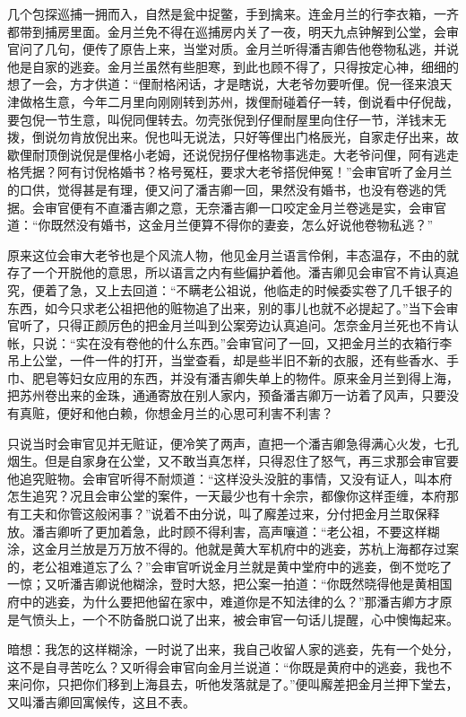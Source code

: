 \documentclass[12pt,UTF8]{ctexbook}
\begin{document}
{{{几个包探巡捕一拥而入，自然是瓮中捉鳖，手到擒来。连金月兰的行李衣箱，一齐都带到捕房里面。金月兰免不得在巡捕房内关了一夜，明天九点钟解到公堂，会审官问了几句，便传了原告上来，当堂对质。金月兰听得潘吉卿告他卷物私逃，并说他是自家的逃妾。金月兰虽然有些胆寒，到此也顾不得了，只得按定心神，细细的想了一会，方才供道：“俚耐格闲话，才是瞎说，大老爷勿要听俚。倪一径来浪天津做格生意，今年二月里向刚刚转到苏州，拨俚耐碰着仔一转，倒说看中仔倪哉，要包倪一节生意，叫倪同俚转去。勿壳张倪到仔俚耐屋里向住仔一节，洋钱末无拨，倒说勿肯放倪出来。倪也叫无说法，只好等俚出门格辰光，自家走仔出来，故歇俚耐顶倒说倪是俚格小老姆，还说倪拐仔俚格物事逃走。大老爷问俚，阿有逃走格凭据？阿有讨倪格婚书？格号冤枉，要求大老爷搭倪伸冤！”会审官听了金月兰的口供，觉得甚是有理，便又问了潘吉卿一回，果然没有婚书，也没有卷逃的凭据。会审官便有不直潘吉卿之意，无奈潘吉卿一口咬定金月兰卷逃是实，会审官道：“你既然没有婚书，这金月兰便算不得你的妻妾，怎么好说他卷物私逃？”

原来这位会审大老爷也是个风流人物，他见金月兰语言伶俐，丰态温存，不由的就存了一个开脱他的意思，所以语言之内有些偏护着他。潘吉卿见会审官不肯认真追究，便着了急，又上去回道：“不瞒老公祖说，他临走的时候委实卷了几千银子的东西，如今只求老公祖把他的赃物追了出来，别的事儿也就不必提起了。”当下会审官听了，只得正颜厉色的把金月兰叫到公案旁边认真追问。怎奈金月兰死也不肯认帐，只说：“实在没有卷他的什么东西。”会审官问了一回，又把金月兰的衣箱行李吊上公堂，一件一件的打开，当堂查看，却是些半旧不新的衣服，还有些香水、手巾、肥皂等妇女应用的东西，并没有潘吉卿失单上的物件。原来金月兰到得上海，把苏州卷出来的金珠，通通寄放在别人家内，预备潘吉卿万一访着了风声，只要没有真赃，便好和他白赖，你想金月兰的心思可利害不利害？

只说当时会审官见并无赃证，便冷笑了两声，直把一个潘吉卿急得满心火发，七孔烟生。但是自家身在公堂，又不敢当真怎样，只得忍住了怒气，再三求那会审官要他追究赃物。会审官听得不耐烦道：“这样没头没脏的事情，又没有证人，叫本府怎生追究？况且会审公堂的案件，一天最少也有十余宗，都像你这样歪缠，本府那有工夫和你管这般闲事？”说着不由分说，叫了廨差过来，分付把金月兰取保释放。潘吉卿听了更加着急，此时顾不得利害，高声嚷道：“老公祖，不要这样糊涂，这金月兰放是万万放不得的。他就是黄大军机府中的逃妾，苏杭上海都存过案的，老公祖难道忘了么？”会审官听说金月兰就是黄中堂府中的逃妾，倒不觉吃了一惊；又听潘吉卿说他糊涂，登时大怒，把公案一拍道：“你既然晓得他是黄相国府中的逃妾，为什么要把他留在家中，难道你是不知法律的么？”那潘吉卿方才原是气愤头上，一个不防备脱口说了出来，被会审官一句话儿提醒，心中懊悔起来。

暗想：我怎的这样糊涂，一时说了出来，我自己收留人家的逃妾，先有一个处分，这不是自寻苦吃么？又听得会审官向金月兰说道：“你既是黄府中的逃妾，我也不来问你，只把你们移到上海县去，听他发落就是了。”便叫廨差把金月兰押下堂去，又叫潘吉卿回寓候传，这且不表。

}}}
\end{document}
